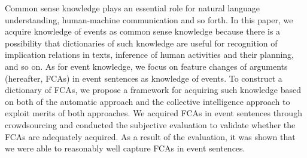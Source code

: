 Common sense knowledge plays an essential role for natural language understanding, human-machine communication and so forth. In this paper, we acquire knowledge of events as common sense knowledge because there is a possibility that dictionaries of such knowledge are useful for recognition of implication relations in texts, inference of human activities and their planning, and so on. As for event knowledge, we focus on feature changes of arguments (hereafter, FCAs) in event sentences as knowledge of events. To construct a dictionary of FCAs, we propose a framework for acquiring such knowledge based on both of the automatic approach and the collective intelligence approach to exploit merits of both approaches. We acquired FCAs in event sentences through crowdsourcing and conducted the subjective evaluation to validate whether the FCAs are adequately acquired. As a result of the evaluation, it was shown that we were able to reasonably well capture FCAs in event sentences.
